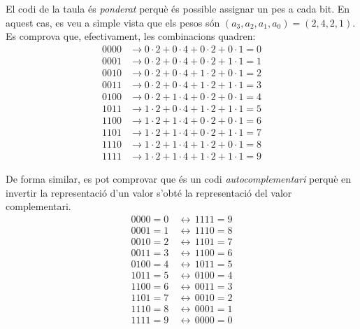 El codi de la taula és \emph{ponderat} perquè és possible assignar un pes a cada bit.
En aquest cas, es veu a simple vista que els pesos són $\left(a_3, a_2, a_1, a_0\right) = \left(2, 4, 2, 1\right)$.
Es comprova que, efectivament, les combinacions quadren:
%
\begin{align*}
  0000 &\rightarrow 0 \cdot 2 + 0 \cdot 4 + 0 \cdot 2 + 0 \cdot 1 = 0 \\
  0001 &\rightarrow 0 \cdot 2 + 0 \cdot 4 + 0 \cdot 2 + 1 \cdot 1 = 1 \\
  0010 &\rightarrow 0 \cdot 2 + 0 \cdot 4 + 1 \cdot 2 + 0 \cdot 1 = 2 \\
  0011 &\rightarrow 0 \cdot 2 + 0 \cdot 4 + 1 \cdot 2 + 1 \cdot 1 = 3 \\
  0100 &\rightarrow 0 \cdot 2 + 1 \cdot 4 + 0 \cdot 2 + 0 \cdot 1 = 4 \\
  1011 &\rightarrow 1 \cdot 2 + 0 \cdot 4 + 1 \cdot 2 + 1 \cdot 1 = 5 \\
  1100 &\rightarrow 1 \cdot 2 + 1 \cdot 4 + 0 \cdot 2 + 0 \cdot 1 = 6 \\
  1101 &\rightarrow 1 \cdot 2 + 1 \cdot 4 + 0 \cdot 2 + 1 \cdot 1 = 7 \\
  1110 &\rightarrow 1 \cdot 2 + 1 \cdot 4 + 1 \cdot 2 + 0 \cdot 1 = 8 \\
  1111 &\rightarrow 1 \cdot 2 + 1 \cdot 4 + 1 \cdot 2 + 1 \cdot 1 = 9
\end{align*}

De forma similar, es pot comprovar que és un codi \emph{autocomplementari} perquè
en invertir la representació d'un valor s'obté la representació del valor complementari.
%
\begin{align*}
  0000 = 0 \, &\leftrightarrow \, 1111 = 9 \\
  0001 = 1 \, &\leftrightarrow \, 1110 = 8 \\
  0010 = 2 \, &\leftrightarrow \, 1101 = 7 \\
  0011 = 3 \, &\leftrightarrow \, 1100 = 6 \\
  0100 = 4 \, &\leftrightarrow \, 1011 = 5 \\
  1011 = 5 \, &\leftrightarrow \, 0100 = 4 \\
  1100 = 6 \, &\leftrightarrow \, 0011 = 3 \\
  1101 = 7 \, &\leftrightarrow \, 0010 = 2 \\
  1110 = 8 \, &\leftrightarrow \, 0001 = 1 \\
  1111 = 9 \, &\leftrightarrow \, 0000 = 0
\end{align*}

